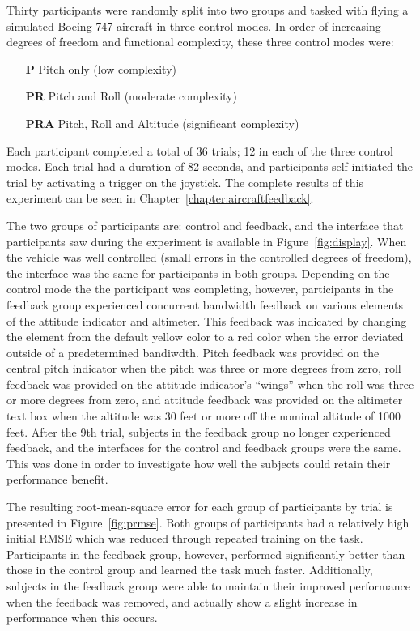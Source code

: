 Thirty participants were randomly split into two groups and tasked with flying a simulated Boeing 747 aircraft in three control modes. In order of increasing degrees of freedom and functional complexity, these three control modes were:
\begin{itemize}
    \item[\textbf{P}] Pitch only (low complexity)
    \item[\textbf{PR}] Pitch and Roll (moderate complexity)
    \item[\textbf{PRA}] Pitch, Roll and Altitude (significant complexity)
\end{itemize}
Each participant completed a total of 36 trials; 12 in each of the three control modes.
Each trial had a duration of 82 seconds, and participants self-initiated the trial by activating a trigger on the joystick.
The complete results of this experiment can be seen in Chapter~\ref{chapter:aircraftfeedback}.

The two groups of participants are: control and feedback, and the interface that participants saw during the experiment is available in Figure~\ref{fig:display}.
When the vehicle was well controlled (small errors in the controlled degrees of freedom), the interface was the same for participants in both groups.
Depending on the control mode the the participant was completing, however, participants in the feedback group experienced concurrent bandwidth feedback on various elements of the attitude indicator and altimeter.
This feedback was indicated by changing the element from the default yellow color to a red color when the error deviated outside of a predetermined bandiwdth.
Pitch feedback was provided on the central pitch indicator when the pitch was three or more degrees from zero, roll feedback was provided on the attitude indicator's ``wings'' when the roll was three or more degrees from zero, and attitude feedback was provided on the altimeter text box when the altitude was 30 feet or more off the nominal altitude of 1000 feet.
After the 9th trial, subjects in the feedback group no longer experienced feedback, and the interfaces for the control and feedback groups were the same.
This was done in order to investigate how well the subjects could retain their performance benefit.

The resulting root-mean-square error for each group of participants by trial is presented in Figure~\ref{fig:prmse}.
Both groups of participants had a relatively high initial RMSE which was reduced through repeated training on the task.
Participants in the feedback group, however, performed significantly better than those in the control group and learned the task much faster.
Additionally, subjects in the feedback group were able to maintain their improved performance when the feedback was removed, and actually show a slight increase in performance when this occurs.

